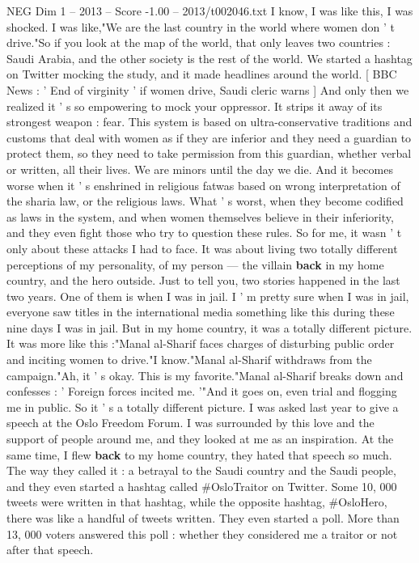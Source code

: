 \begin{textsample}{NEG Dim 1 – 2013 – Score -1.00 – 2013/t002046.txt}
I know, I was like this, I was shocked.
I was like,"We are the last country in the world where women don ' t drive."So if you look at the map of the world, that only leaves two countries : Saudi Arabia, and the other society is the rest of the world.
We started a hashtag on Twitter mocking the study, and it made headlines around the world. [ BBC News : ' End of virginity ' if women drive, Saudi cleric warns ] And only then we realized it ' s so empowering to mock your oppressor.
It strips it away of its strongest weapon : fear.
This system is based on ultra-conservative traditions and customs that deal with women as if they are inferior and they need a guardian to protect them, so they need to take permission from this guardian, whether verbal or written, all their lives.
We are minors until the day we die.
And it becomes worse when it ' s enshrined in religious fatwas based on wrong interpretation of the sharia law, or the religious laws.
What ' s worst, when they become codified as laws in the system, and when women themselves believe in their inferiority, and they even fight those who try to question these rules.
So for me, it wasn ' t only about these attacks I had to face.
It was about living two totally different perceptions of my personality, of my person — the villain \textbf{back} in my home country, and the hero outside.
Just to tell you, two stories happened in the last two years.
One of them is when I was in jail.
I ' m pretty sure when I was in jail, everyone saw titles in the international media something like this during these nine days I was in jail.
But in my home country, it was a totally different picture.
It was more like this :"Manal al-Sharif faces charges of disturbing public order and inciting women to drive."I know."Manal al-Sharif withdraws from the campaign."Ah, it ' s okay.
This is my favorite."Manal al-Sharif breaks down and confesses : ' Foreign forces incited me. '"And it goes on, even trial and flogging me in public.
So it ' s a totally different picture.
I was asked last year to give a speech at the Oslo Freedom Forum.
I was surrounded by this love and the support of people around me, and they looked at me as an inspiration.
At the same time, I flew \textbf{back} to my home country, they hated that speech so much.
The way they called it : a betrayal to the Saudi country and the Saudi people, and they even started a hashtag called \#OsloTraitor on Twitter.
Some 10, 000 tweets were written in that hashtag, while the opposite hashtag, \#OsloHero, there was like a handful of tweets written.
They even started a poll.
More than 13, 000 voters answered this poll : whether they considered me a traitor or not after that speech.

\end{textsample}
